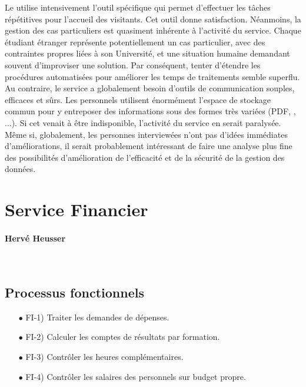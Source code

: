 \documentclass{book}
\begin{document}
Le \sintl utilise intensivement l'outil spécifique \textit{}
qui permet d'effectuer les tâches répétitives pour l'accueil des visitants.
Cet outil donne satisfaction. 
Néanmoins, la gestion des cas particuliers est quasiment inhérente à 
l'activité du service. Chaque étudiant étranger représente potentiellement
un cas particulier, avec des contraintes propres liées à son Université,
et une situation humaine demandant souvent d'improviser une solution. Par 
conséquent, tenter d'étendre les procédures automatisées pour améliorer les 
temps de traitements semble superflu.
Au contraire, le service a globalement besoin d'outils de communication
souples, efficaces et sûrs. Les personnels utilisent énormément l'espace
de stockage commun\index{\clecommun} pour y entreposer des informations
sous des formes très variées (PDF, , ...). Si cet \motcle{\clecommun}
venait à être indisponible, l'activité du service en serait paralysée.
Même si, globalement, les personnes interviewées n'ont pas d'idées immédiates
d'améliorations, il serait probablement intéressant de faire une analyse
plus fine des possibilités d'amélioration de  l'efficacité et de la sécurité 
de la gestion des données.  
 


\section{Service Financier}

\paragraph{Hervé Heusser}
~\\

\subsection{Processus fonctionnels}

\begin{itemize}
\item[$\bullet$] FI-1) Traiter les demandes de dépenses.
\item[$\bullet$] FI-2) Calculer les comptes de résultats par formation.
\item[$\bullet$] FI-3) Contrôler les heures complémentaires.
\item[$\bullet$] FI-4) Contrôler les salaires des personnels sur budget propre. 
\end{itemize}
\end{document}
